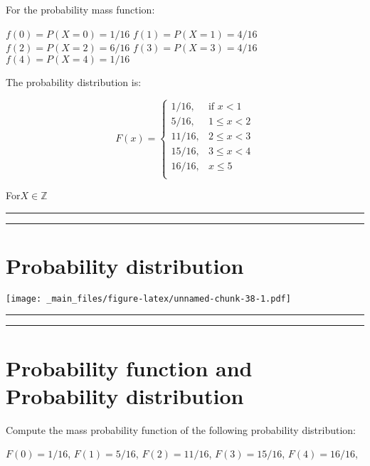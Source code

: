 \documentclass[
]{book}
\begin{document}
For the probability mass function:

\(f(0)=P(X=0)=1/16\)
\(f(1)=P(X=1)=4/16\)
\(f(2)=P(X=2)=6/16\)
\(f(3)=P(X=3)=4/16\)
\(f(4)=P(X=4)=1/16\)

The probability distribution is:

\[
    F(x)=
\begin{cases}
    1/16,& \text{if } x < 1\\
    5/16,& 1\leq x < 2\\
    11/16,& 2\leq x < 3\\
    15/16,& 3\leq x < 4\\
    16/16,&  x \leq 5\\
\end{cases}
\]

For\(X \in \mathbb{Z}\)

\begin{center}\rule{0.5\linewidth}{0.5pt}\end{center}

\begin{center}\rule{0.5\linewidth}{0.5pt}\end{center}

\hypertarget{probability-distribution-1}{%
\section{Probability distribution}\label{probability-distribution-1}}

\texttt{[image: \_main\_files/figure-latex/unnamed-chunk-38-1.pdf]}

\begin{center}\rule{0.5\linewidth}{0.5pt}\end{center}

\begin{center}\rule{0.5\linewidth}{0.5pt}\end{center}

\hypertarget{probability-function-and-probability-distribution}{%
\section{Probability function and Probability distribution}\label{probability-function-and-probability-distribution}}

Compute the mass probability function of the following probability distribution:

\(F(0)=1/16\), \(F(1)=5/16\), \(F(2)=11/16\), \(F(3)=15/16\), \(F(4)=16/16\),
\end{document}
